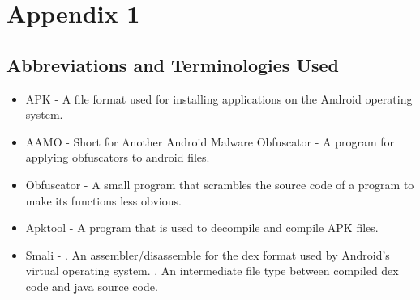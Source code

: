 \chapter{Appendix 1\label{app:a}}

\section{Abbreviations and Terminologies Used}

\begin{itemize}
	\item APK - A file format used for installing applications on the Android operating system.
	\item AAMO - Short for  Another Android Malware Obfuscator - A program for applying obfuscators to android files.
	\item Obfuscator - A small program that scrambles the source code of a program to make its functions less obvious.
	\item Apktool - A program that is used to decompile and compile APK files.
	\item Smali - . An assembler/disassemble for the dex format used by Android's virtual operating system.
	. An intermediate file type between compiled dex code and java source code.
	
\end{itemize}